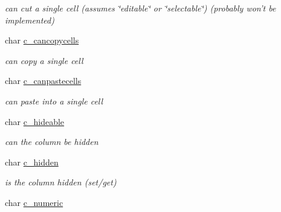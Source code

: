 \begin{DoxyCompactItemize}
\begin{DoxyCompactList}\small\item\em can cut a single cell (assumes \char`\"{}editable\char`\"{} or \char`\"{}selectable\char`\"{}) (probably won't be implemented) \item\end{DoxyCompactList}\item 
\hypertarget{structt__jcolumn_a78231bf7c09bc1390568878b4783b9c8}{
char \hyperlink{structt__jcolumn_a78231bf7c09bc1390568878b4783b9c8}{c\_\-cancopycells}}
\label{structt__jcolumn_a78231bf7c09bc1390568878b4783b9c8}

\begin{DoxyCompactList}\small\item\em can copy a single cell \item\end{DoxyCompactList}\item 
\hypertarget{structt__jcolumn_a8f19858aa937e7b9b1195ae970cc9a5d}{
char \hyperlink{structt__jcolumn_a8f19858aa937e7b9b1195ae970cc9a5d}{c\_\-canpastecells}}
\label{structt__jcolumn_a8f19858aa937e7b9b1195ae970cc9a5d}

\begin{DoxyCompactList}\small\item\em can paste into a single cell \item\end{DoxyCompactList}\item 
\hypertarget{structt__jcolumn_a6aa476eeacffd26d8cd8f4ad63de8e52}{
char \hyperlink{structt__jcolumn_a6aa476eeacffd26d8cd8f4ad63de8e52}{c\_\-hideable}}
\label{structt__jcolumn_a6aa476eeacffd26d8cd8f4ad63de8e52}

\begin{DoxyCompactList}\small\item\em can the column be hidden \item\end{DoxyCompactList}\item 
\hypertarget{structt__jcolumn_a2be74ce148dc93c7ce800658c3619255}{
char \hyperlink{structt__jcolumn_a2be74ce148dc93c7ce800658c3619255}{c\_\-hidden}}
\label{structt__jcolumn_a2be74ce148dc93c7ce800658c3619255}

\begin{DoxyCompactList}\small\item\em is the column hidden (set/get) \item\end{DoxyCompactList}\item 
\hypertarget{structt__jcolumn_aba9c14305b25c7769c8c64a677e8bf1f}{
char \hyperlink{structt__jcolumn_aba9c14305b25c7769c8c64a677e8bf1f}{c\_\-numeric}}
\label{structt__jcolumn_aba9c14305b25c7769c8c64a677e8bf1f}


\end{DoxyCompactItemize}
